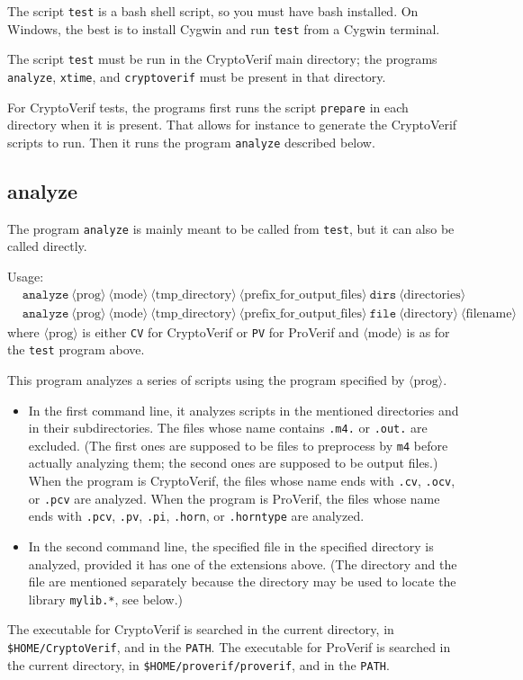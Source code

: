 \documentclass{article}
\newcommand{\nonterm}[1]{\langle\textrm{#1}\rangle}
\begin{document}
The script \texttt{test} is a bash shell script, so you must have bash
installed. On Windows, the best is to install Cygwin and run \texttt{test}
from a Cygwin terminal.

The script \texttt{test} must be run in the CryptoVerif main directory;
the programs \texttt{analyze}, \texttt{xtime}, and \texttt{cryptoverif}
must be present in that directory.

For CryptoVerif tests, the programs first runs the script {\tt prepare}
in each directory when it is present. That allows for instance to
generate the CryptoVerif scripts to run.
Then it runs the program {\tt analyze} described below.

\subsection{\ttfamily analyze}

The program {\tt analyze} is mainly meant to be called from {\tt test},
but it can also be called directly.

Usage: 
\begin{align*}
&\texttt{analyze}\ \nonterm{prog}\ \nonterm{mode}\ \nonterm{tmp\_directory}\ \nonterm{prefix\_for\_output\_files}\ \texttt{dirs}\ \nonterm{directories}\\
&\texttt{analyze}\ \nonterm{prog}\ \nonterm{mode}\ \nonterm{tmp\_directory}\ \nonterm{prefix\_for\_output\_files}\ \texttt{file}\ \nonterm{directory}\ \nonterm{filename}
\end{align*}
where $\nonterm{prog}$ is either \texttt{CV} for CryptoVerif or
\texttt{PV} for ProVerif and $\nonterm{mode}$ is as for the
\texttt{test} program above.

This program analyzes a series of scripts using the program specified by $\nonterm{prog}$.
\begin{itemize}

\item In the first command line, it analyzes scripts in the mentioned directories and in their subdirectories.
  The files whose name contains \texttt{.m4.} or \texttt{.out.} are excluded. (The first ones are supposed to be files
  to preprocess by \texttt{m4} before actually analyzing them; the second ones are supposed to be output files.)
  When the program is CryptoVerif, the files whose name ends with \texttt{.cv}, \texttt{.ocv}, or \texttt{.pcv} are
  analyzed. When the program is ProVerif, the files whose name ends with \texttt{.pcv}, \texttt{.pv}, \texttt{.pi},
  \texttt{.horn}, or \texttt{.horntype} are analyzed.

\item In the second command line, the specified file in the specified directory is analyzed, provided it has one of the extensions above. (The directory and the file are mentioned separately because the directory may be used to locate the library \texttt{mylib.*}, see below.)

\end{itemize}
The executable for CryptoVerif is searched in the current directory, in \texttt{\$HOME/CryptoVerif}, and in the \texttt{PATH}. The executable for ProVerif is searched in the current directory, in \texttt{\$HOME/proverif/proverif}, and in the \texttt{PATH}.
\end{document}
